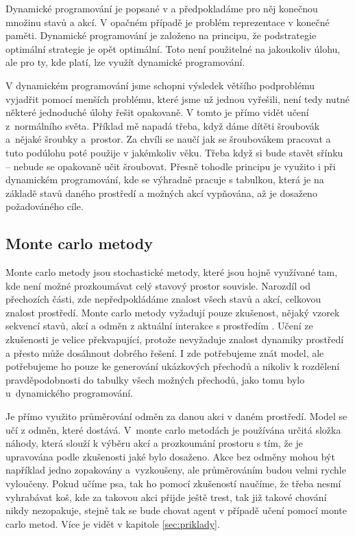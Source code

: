 \documentclass{article}
\begin{document}
Dynamické programování je popsané v \cite{sutton1998introduction} a předpokladáme pro něj konečnou množinu stavů a akcí. V opačném případě je problém reprezentace v konečné paměti. Dynamické programování je založeno na principu, že podstrategie optimální strategie je opět optimální. Toto není použitelné na jakoukoliv úlohu, ale pro ty, kde platí, lze využít dynamické programování. 

V dynamickém programování jsme schopni výsledek většího podproblému vyjadřit pomocí menších problému, které jsme už jednou vyřešili, není tedy nutné některé jednoduché úlohy řešit opakovaně. V tomto je přímo vidět učení z~normálního světa. Příklad mě napadá třeba, když dáme dítěti šroubovák a~nějaké šroubky a~prostor. Za chvíli se naučí jak se šroubovákem pracovat a tuto podúlohu poté použije v jakémkoliv věku. Třeba když si bude stavět sřínku -- nebude se opakovaně učit šroubovat. Přesně tohodle principu je využito i při dynamickém programování, kde se výhradně pracuje s tabulkou, která je na základě stavů daného prostředí a možných akcí vypňována, až je dosaženo požadováného cíle.

\subsection{Monte carlo metody}
Monte carlo metody jsou stochastické metody, které jsou hojně využívané tam, kde není možné prozkoumávat celý stavový prostor souvisle. Narozdíl od přechozích části, zde nepředpokládáme znalost všech stavů a akcí, celkovou znalost prostředí. Monte carlo metody vyžadují pouze zkušenost, nějaký vzorek sekvencí stavů, akcí a odměn z aktuální interakce s prostředím \cite{sutton1998introduction}. Učení ze zkušenosti je velice překvapující, protože nevyžaduje znalost dynamiky prostředí a přesto může dosáhnout dobrého řešení. I zde potřebujeme znát model, ale potřebujeme ho pouze ke generování ukázkových přechodů a nikoliv k rozdělení pravděpodobnosti do tabulky všech možných přechodů, jako tomu bylo u~dynamického programování. 

Je přímo využito průměrování odměn za danou akci v daném prostředí. Model se učí z odměn, které dostává. V~monte carlo metodách je používána určitá složka náhody, která slouží k výběru akcí a prozkoumání prostoru s tím, že je upravována podle zkušenosti jaké bylo dosaženo. Akce bez odměny mohou být například jedno zopakovány a~vyzkoušeny, ale průměrováním budou velmi rychle vyloučeny. Pokud učíme psa, tak ho pomocí zkušeností naučíme, že třeba nesmí vyhrabávat koš, kde za takovou akci přijde ještě trest, tak již takové chování nikdy nezopakuje, stejně tak se bude chovat agent v případě učení pomocí monte carlo metod. Více je vidět v kapitole \ref{sec:priklady}. 
\end{document}
